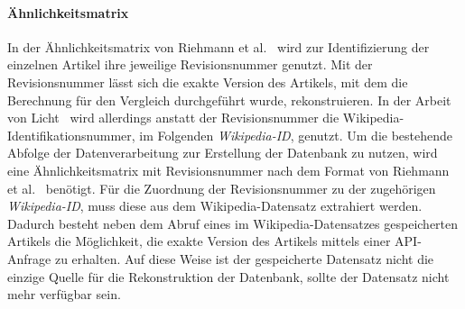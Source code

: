 \paragraph{Ähnlichkeitsmatrix}
In der Ähnlichkeitsmatrix von Riehmann et al.~\cite{riehmann2016visualizing} wird zur Identifizierung der einzelnen Artikel ihre jeweilige Revisionsnummer genutzt.
Mit der Revisionsnummer lässt sich die exakte Version des Artikels, mit dem die Berechnung für den Vergleich durchgeführt wurde, rekonstruieren.
In der Arbeit von Licht~\cite{licht:2017} wird allerdings anstatt der Revisionsnummer die Wikipedia-Identifikationsnummer, im Folgenden \emph{Wikipedia-ID}, genutzt.
Um die bestehende Abfolge der Datenverarbeitung zur Erstellung der Datenbank zu nutzen, wird eine Ähnlichkeitsmatrix mit Revisionsnummer nach dem Format von Riehmann et al.~\cite{riehmann2016visualizing} benötigt.
Für die Zuordnung der Revisionsnummer zu der zugehörigen \emph{Wikipedia-ID}, muss diese aus dem Wikipedia-Datensatz extrahiert werden.
Dadurch besteht neben dem Abruf eines im Wikipedia-Datensatzes gespeicherten Artikels die Möglichkeit, die exakte Version des Artikels mittels einer API-Anfrage zu erhalten.
Auf diese Weise ist der gespeicherte Datensatz nicht die einzige Quelle für die Rekonstruktion der Datenbank, sollte der Datensatz nicht mehr verfügbar sein.

